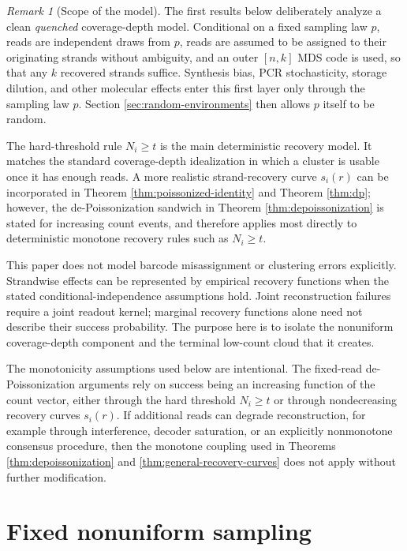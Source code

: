 \documentclass[11pt]{article}
\theoremstyle{definition}
\theoremstyle{remark}
\newtheorem{remark}{Remark}
\newcommand{\1}{\mathbf 1}
\begin{document}
\begin{remark}[Scope of the model]
The first results below deliberately analyze a clean \emph{quenched} coverage-depth model.  Conditional on a fixed sampling law \(p\), reads are independent draws from \(p\), reads are assumed to be assigned to their originating strands without ambiguity, and an outer \([n,k]\) MDS code is used, so that any \(k\) recovered strands suffice.  Synthesis bias, PCR stochasticity, storage dilution, and other molecular effects enter this first layer only through the sampling law \(p\).  Section \ref{sec:random-environments} then allows \(p\) itself to be random.

The hard-threshold rule \(N_i\ge t\) is the main deterministic recovery model.  It matches the standard coverage-depth idealization in which a cluster is usable once it has enough reads.  A more realistic strand-recovery curve \(s_i(r)\) can be incorporated in Theorem \ref{thm:poissonized-identity} and Theorem \ref{thm:dp}; however, the de-Poissonization sandwich in Theorem \ref{thm:depoissonization} is stated for increasing count events, and therefore applies most directly to deterministic monotone recovery rules such as \(N_i\ge t\).

This paper does not model barcode misassignment or clustering errors explicitly. Strandwise effects can be represented by empirical recovery functions when the stated conditional-independence assumptions hold. Joint reconstruction failures require a joint readout kernel; marginal recovery functions alone need not describe their success probability. The purpose here is to isolate the nonuniform coverage-depth component and the terminal low-count cloud that it creates.

The monotonicity assumptions used below are intentional.  The fixed-read de-Poissonization arguments rely on success being an increasing function of the count vector, either through the hard threshold \(N_i\ge t\) or through nondecreasing recovery curves \(s_i(r)\).  If additional reads can degrade reconstruction, for example through interference, decoder saturation, or an explicitly nonmonotone consensus procedure, then the monotone coupling used in Theorems \ref{thm:depoissonization} and \ref{thm:general-recovery-curves} does not apply without further modification.

\end{remark}

\section{Fixed nonuniform sampling}
\end{document}
